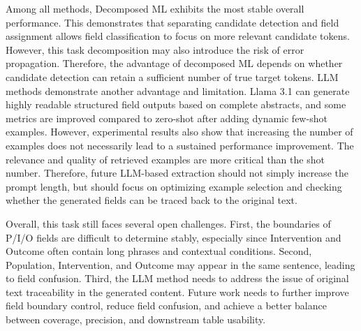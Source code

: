 \documentclass{article}
\begin{document}
Among all methods, Decomposed ML exhibits the most stable overall performance. This demonstrates that separating candidate detection and field assignment allows field classification to focus on more relevant candidate tokens. However, this task decomposition may also introduce the risk of error propagation. Therefore, the advantage of decomposed ML depends on whether candidate detection can retain a sufficient number of true target tokens. LLM methods demonstrate another advantage and limitation. Llama 3.1 can generate highly readable structured field outputs based on complete abstracts, and some metrics are improved compared to zero-shot after adding dynamic few-shot examples. However, experimental results also show that increasing the number of examples does not necessarily lead to a sustained performance improvement. The relevance and quality of retrieved examples are more critical than the shot number. Therefore, future LLM-based extraction should not simply increase the prompt length, but should focus on optimizing example selection and checking whether the generated fields can be traced back to the original text.


Overall, this task still faces several open challenges. First, the boundaries of P/I/O fields are difficult to determine stably, especially since Intervention and Outcome often contain long phrases and contextual conditions. Second, Population, Intervention, and Outcome may appear in the same sentence, leading to field confusion. Third, the LLM method needs to address the issue of original text traceability in the generated content. Future work needs to further improve field boundary control, reduce field confusion, and achieve a better balance between coverage, precision, and downstream table usability.
 

\end{document}
